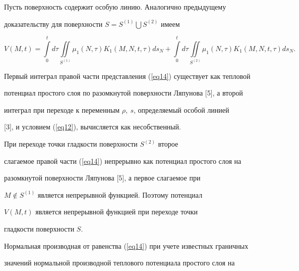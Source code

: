 \begin{pf}


Пусть поверхность содержит особую линию. Аналогично предыдущему 


доказательству для поверхности $S=S^{({1} )}\bigcup {S^{({2})}} $ имеем


\begin{equation}


\label{eq14}


V ({M,t})=\int\limits_{0}^{t} {} d\tau 


\iint\limits_{S^{({1})}} {} \mu_{1} ({N,\tau} 


)K_{1} ({M,N,t,\tau})ds_{N}+


%


\int\limits_{0}^{t} {} d\tau \iint\limits_{S^{({2} 


)}} {} \mu_{1} ({N,\tau})K_{1} ({M,N,t,\tau} )ds_{N}. 


\end{equation}





Первый интеграл правой части представления (\ref{eq14}) существует как тепловой 


потенциал простого слоя по разомкнутой поверхности Ляпунова [5], а второй 


интеграл при переходе к переменным $\rho,\ s$, определяемый особой линией 


[3], и условием (\ref{eq12}), вычисляется как несобственный.





При переходе точки гладкости поверхности $S^{({2})}$ второе 


слагаемое правой части (\ref{eq14}) непрерывно как потенциал простого слоя на 


разомкнутой поверхности Ляпунова [5], а первое слагаемое при 


$M \notin S^{({1})}$ является непрерывной функцией. Поэтому потенциал 


$V ({M,t})$ является непрерывной функцией при переходе точки 


гладкости поверхности $S$.





Нормальная производная от равенства (\ref{eq14}) при учете известных граничных 


значений нормальной производной теплового потенциала простого слоя на 



\end{pf}
